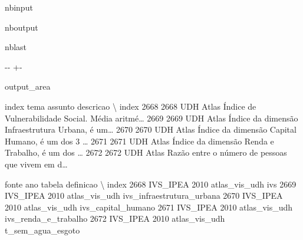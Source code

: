 \documentclass[letterpaper,10pt,brazil]{sphinxmanual}
\newlength\nbsphinxcodecellspacing
\begin{document}
\begin{sphinxuseclass}{nbinput}
{
\begin{sphinxVerbatim}[commandchars=\\\{\}]
\llap{\color{nbsphinxin}[7]:\,\hspace{\fboxrule}\hspace{\fboxsep}}  
\end{sphinxVerbatim}
}

\end{sphinxuseclass}
\begin{sphinxuseclass}{nboutput}
\begin{sphinxuseclass}{nblast}
{

\kern-\sphinxverbatimsmallskipamount\kern-\baselineskip
\kern+\FrameHeightAdjust\kern-\fboxrule
\vspace{\nbsphinxcodecellspacing}

\begin{sphinxuseclass}{output_area}
\begin{sphinxuseclass}{}


\begin{sphinxVerbatim}[commandchars=\\\{\}]
\llap{\color{nbsphinxout}[7]:\,\hspace{\fboxrule}\hspace{\fboxsep}}       index tema assunto                                          descricao  \textbackslash{}
index
2668    2668  UDH   Atlas  Índice de Vulnerabilidade Social. Média aritmé{\ldots}
2669    2669  UDH   Atlas  Índice da dimensão Infraestrutura Urbana, é um{\ldots}
2670    2670  UDH   Atlas  Índice da dimensão Capital Humano, é um dos 3 {\ldots}
2671    2671  UDH   Atlas  Índice da dimensão Renda e Trabalho, é um dos {\ldots}
2672    2672  UDH   Atlas  Razão entre o número de pessoas que vivem em d{\ldots}

          fonte   ano         tabela                  definicao  \textbackslash{}
index
2668   IVS\_IPEA  2010  atlas\_vis\_udh                        ivs
2669   IVS\_IPEA  2010  atlas\_vis\_udh  ivs\_infraestrutura\_urbana
2670   IVS\_IPEA  2010  atlas\_vis\_udh         ivs\_capital\_humano
2671   IVS\_IPEA  2010  atlas\_vis\_udh       ivs\_renda\_e\_trabalho
2672   IVS\_IPEA  2010  atlas\_vis\_udh          t\_sem\_agua\_esgoto


\end{sphinxVerbatim}
\end{sphinxuseclass}
\end{sphinxuseclass}}
\end{sphinxuseclass}
\end{sphinxuseclass}
\end{document}

